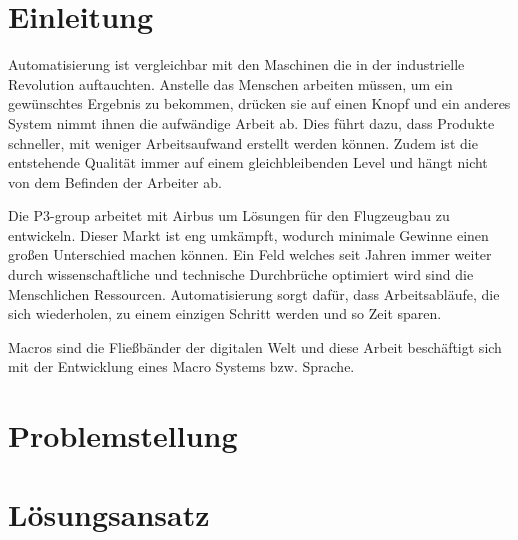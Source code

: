




\tableofcontents
\newpage

\section{Einleitung}
\label{sec:einleitung}
  Automatisierung ist vergleichbar mit den Maschinen die in der industrielle Revolution auftauchten. Anstelle das Menschen arbeiten müssen, um ein gewünschtes Ergebnis zu bekommen, drücken sie auf einen Knopf und ein anderes System nimmt ihnen die aufwändige Arbeit ab. Dies führt dazu, dass Produkte schneller, mit weniger Arbeitsaufwand erstellt werden können. Zudem ist die entstehende Qualität immer auf einem gleichbleibenden Level und hängt nicht von dem Befinden der Arbeiter ab.

  Die P3-group arbeitet mit Airbus um Lösungen für den Flugzeugbau zu entwickeln. Dieser Markt ist eng umkämpft, wodurch minimale Gewinne einen großen Unterschied machen können. Ein Feld welches seit Jahren immer weiter durch wissenschaftliche und technische Durchbrüche optimiert wird sind die Menschlichen Ressourcen. Automatisierung sorgt dafür, dass Arbeitsabläufe, die sich wiederholen, zu einem einzigen Schritt werden und so Zeit sparen.

  Macros sind die Fließbänder der digitalen Welt und diese Arbeit beschäftigt sich mit der Entwicklung eines Macro Systems bzw. Sprache.


\section{Problemstellung}
\label{sec:problemstellung}

\section{Lösungsansatz}
\label{sec:loesungsansatz}

